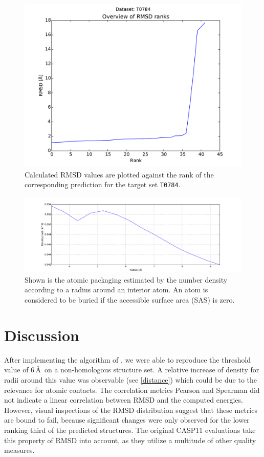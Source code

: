 \documentclass[11pt,a4paper]{article}
\begin{document}
\begin{figure}[tbp]%
    \centering
    \includegraphics[width=.7\textwidth]{../results/rank_T0784}
    \caption{Calculated RMSD values are plotted against the rank of the
        corresponding prediction
        for the target set
        \texttt{T0784}.}
    \label{ranks}
\end{figure}
\begin{figure}[tbp]%
    \centering
    \includegraphics[width=1\textwidth]{figures/better.pdf}
    \caption{Shown is the atomic packaging estimated by the number density
    according to a radius around an interior atom. An atom is considered to be
    buried if the accessible surface area (SAS) is zero.}
    \label{distance}
\end{figure}



\section{Discussion}

After implementing the algorithm of \citet{Zhang1997}, we were able to reproduce
the threshold value of $6$\,\AA\ on a non-homologous structure set.
A relative increase of density
for radii around this value
was observable (see \autoref{distance}) which could be
due to the relevance for atomic contacts.
The correlation metrics Pearson and Spearman did not indicate a linear
correlation between RMSD and the computed energies.
However, visual inspections 
of the RMSD distribution suggest that these metrics are bound to fail, because
significant changes were only observed for the lower ranking third of the
predicted structures.
The original CASP11 evaluations take this property of RMSD into account, as they utilize a multitude of other quality measures.
\end{document}
